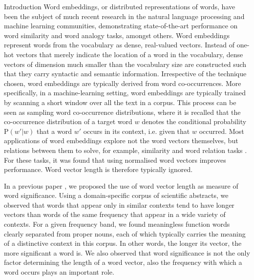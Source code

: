 \documentclass{article} %
\newcommand{\p}{\mathrm{P}}
\begin{document}
\begin{section}{Introduction}
Word embeddings, or distributed representations of words, have been the subject
of much recent research in the natural language processing and machine learning
communities, demonstrating state-of-the-art performance on word similarity and
word analogy tasks, amongst others.
Word embeddings represent words from the vocabulary as dense, real-valued
vectors.  Instead of one-hot vectors that merely indicate the location
of a word in the vocabulary, dense
vectors of dimension much smaller than the vocabulary size are
constructed such that they carry syntactic and semantic information.
Irrespective of the technique chosen, word embeddings are
typically derived from word co-occurrences.  More specifically, in a
machine-learning setting, word embeddings are typically trained by
scanning a short window over all the text in a corpus.  This process can
be seen as sampling word co-occurrence distributions, where it is
recalled that the co-occurrence distribution of a target word $w$
denotes the conditional probability $\p(w'|w)$ that a word $w'$ occurs in
its context, i.e. given that $w$ occurred.  Most applications of word
embeddings explore not the word vectors themselves, but relations
between them to solve, for example, similarity and word relation tasks
\cite{vecchi-baroni-zamparelli2011}.  For these tasks, it was found that using normalised word
vectors improves performance.  Word vector length is therefore typically
ignored.

In a previous paper \cite{schakel-wilson}, we proposed the use of word
vector length as measure of word significance.  Using a domain-specific
corpus of scientific abstracts, we observed that words that appear only
in similar contexts tend to have longer vectors than words of the same
frequency that appear in a wide variety of contexts.  For a given
frequency band, we found meaningless function words clearly separated
from proper nouns, each of which typically carries the meaning of a
distinctive context in this corpus.  In other words, the longer its
vector, the more significant a word is.  We also observed that word
significance is not the only factor determining the length of a word
vector, also the frequency with which a word occurs plays an important
role.


\end{section}
\end{document}
